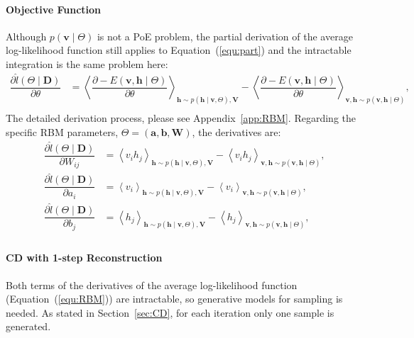 \paragraph{Objective Function}	
Although $ p(\mathbf{v} \mid \Theta) $ is not a PoE problem, the partial derivation of the average log-likelihood function still applies to Equation~(\ref{equ:part}) and the intractable integration is the same problem here:
\begin{equation}
\label{equ:RBM}
\begin{aligned}
\dfrac{\partial \hat{l} (\Theta \mid \mathbf{D})}{\partial \theta} 
& = \left \langle \dfrac{\partial -E(\mathbf{v}, \mathbf{h} \mid \Theta)}{\partial \theta} \right \rangle_{\mathbf{h} \sim p( \mathbf{h} \mid \mathbf{v}, \Theta), \mathbf{V}} 
- \left \langle \dfrac{\partial -E(\mathbf{v}, \mathbf{h} \mid \Theta)}{\partial \theta} \right \rangle_{\mathbf{v}, \mathbf{h} \sim p( \mathbf{v}, \mathbf{h} \mid  \Theta)},  \\
\end{aligned}
\end{equation}
The detailed derivation process, please see Appendix~\ref{app:RBM}.
Regarding the specific RBM parameters,  $ \Theta = (\mathbf{a}, \mathbf{b}, \mathbf{W}) $, the derivatives are:
\begin{equation}
\label{equ:RBM_2}
\begin{aligned}
\dfrac{\partial \hat{l} (\Theta \mid \mathbf{D})}{\partial W_{ij}} 
& = \left \langle v_i h_j \right \rangle_{\mathbf{h} \sim p( \mathbf{h} \mid \mathbf{v}, \Theta), \mathbf{V}} 
- \left \langle  v_i h_j \right \rangle_{\mathbf{v}, \mathbf{h} \sim p( \mathbf{v}, \mathbf{h} \mid  \Theta)},  \\
\dfrac{\partial \hat{l} (\Theta \mid \mathbf{D})}{\partial a_{i}} 
& = \left \langle v_i \right \rangle_{\mathbf{h} \sim p( \mathbf{h} \mid \mathbf{v}, \Theta), \mathbf{V}} 
- \left \langle  v_i \right \rangle_{\mathbf{v}, \mathbf{h} \sim p( \mathbf{v}, \mathbf{h} \mid  \Theta)},  \\
\dfrac{\partial \hat{l} (\Theta \mid \mathbf{D})}{\partial b_{j}} 
& = \left \langle h_j \right \rangle_{\mathbf{h} \sim p( \mathbf{h} \mid \mathbf{v}, \Theta), \mathbf{V}} 
- \left \langle  h_j \right \rangle_{\mathbf{v}, \mathbf{h} \sim p( \mathbf{v}, \mathbf{h} \mid  \Theta)},  \\
\end{aligned}
\end{equation}
\paragraph{CD with 1-step Reconstruction} 
\label{sec:cd}
Both terms of the derivatives of the average log-likelihood function (Equation~(\ref{equ:RBM})) are intractable, so generative models for sampling is needed.
As stated in Section~\ref{sec:CD}, for each iteration only one sample is generated.

